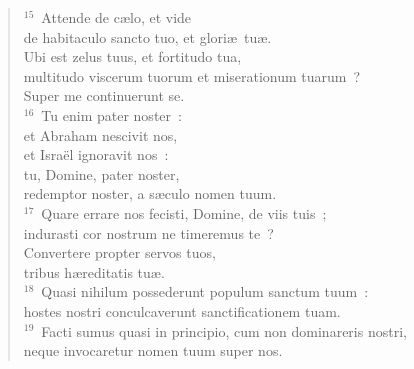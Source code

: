\begin{flushleft}
\begin{verse}
${}^{15}$~Attende de c\ae lo, et vide\\ de habitaculo sancto tuo, et glori\ae\ tu\ae .\\ Ubi est zelus tuus, et fortitudo tua,\\ multitudo viscerum tuorum et miserationum tuarum~?\\ Super me continuerunt se.\\
${}^{16}$~Tu enim pater noster~:\\ et Abraham nescivit nos,\\ et Isra\"el ignoravit nos~:\\ tu, Domine, pater noster,\\ redemptor noster, a s\ae culo nomen tuum.\\
${}^{17}$~Quare errare nos fecisti, Domine, de viis tuis~;\\ indurasti cor nostrum ne timeremus te~?\\ Convertere propter servos tuos,\\ tribus h\ae reditatis tu\ae .\\
${}^{18}$~Quasi nihilum possederunt populum sanctum tuum~:\\ hostes nostri conculcaverunt sanctificationem tuam.\\
${}^{19}$~Facti sumus quasi in principio, cum non dominareris nostri,\\ neque invocaretur nomen tuum super nos.\end{verse}\end{flushleft}


